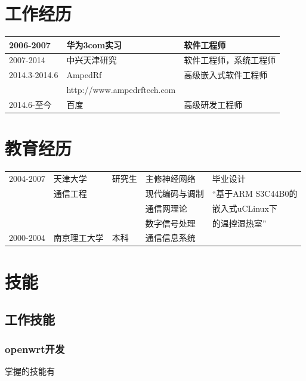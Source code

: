 \documentclass[titlepage]{article}
\begin{document}
\section{工作经历}

\begin{tabular}{|l|l|l|}
\hline
2006-2007 & 华为3com实习 & 软件工程师 \\
\hline
2007-2014 & 	中兴天津研究 & 	软件工程师，系统工程师 \\
\hline
2014.3-2014.6 & 	AmpedRf  & 	高级嵌入式软件工程师 \\
             &  http://www.ampedrftech.com &                         \\
\hline
2014.6-至今 & 百度 & 高级研发工程师 \\
\hline
\end{tabular}

\section{教育经历}

\begin{tabular}{|l|l|l|l|l|}
\hline
2004-2007 & 天津大学  & 研究生 &  主修神经网络 & 毕业设计 \\
          & 通信工程  &        & 现代编码与调制&“基于ARM S3C44B0的\\
          &           &        & 通信网理论    & 嵌入式uCLinux下\\
          &           &        & 数字信号处理  &的温控湿热室”\\
\hline
2000-2004 & 南京理工大学  & 本科 &  通信信息系统 &  \\
\hline
\end{tabular}


\section{技能}

\subsection{工作技能}



\subsubsection{openwrt开发}

掌握的技能有
\end{document}
